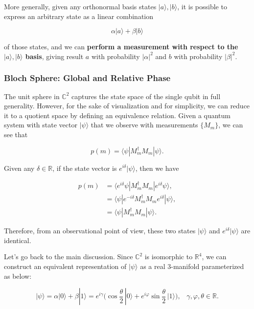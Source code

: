 \documentclass{article}
\theoremstyle{definition}
\begin{document}
      More generally, given any orthonormal basis states $|a \rangle, |b \rangle$, it is possible to express an arbitrary state as a linear combination

        \[ \alpha |a \rangle + \beta |b \rangle \]

      of those states, and we can \textbf{perform a measurement with respect to the $|a\rangle, |b\rangle$ basis}, giving result $a$ with probability $|\alpha|^2$ and $b$ with probability $|\beta|^2$.
  
      \subsubsection{Bloch Sphere: Global and Relative Phase}

        The unit sphere in $\mathbb{C}^2$ captures the state space of the single qubit in full generality. However, for the sake of visualization and for simplicity, we can reduce it to a quotient space by defining an equivalence relation. Given a quantum system with state vector $|\psi \rangle$ that we observe with measurements $\{M_m\}$, we can see that

        \[p(m) = \langle \psi | M_m^\dagger M_m | \psi \rangle.\]

        Given any $\delta \in \mathbb{R}$, if the state vector is $e^{i\delta} |\psi \rangle$, then we have

        \begin{align*}
          p(m) & = \langle e^{i \delta} \psi | M_m^\dagger M_m | e^{i \delta} \psi \rangle, \\
          & = \langle \psi | e^{-i \delta} M_m^\dagger M_m e^{i \delta} | \psi \rangle, \\
          & = \langle \psi | M_m^\dagger M_m | \psi \rangle.
        \end{align*}

        Therefore, from an observational point of view, these two states $|\psi \rangle$ and $e^{i \delta} |\psi \rangle$ are identical.

        Let's go back to the main discussion. Since $\mathbb{C}^2$ is isomorphic to $\mathbb{R}^4$, we can construct an equivalent representation of $|\psi \rangle$ as a real 3-manifold parameterized as below:

          \[|\psi \rangle = \alpha |0 \rangle + \beta | 1 \rangle = e^{i \gamma} \bigg( \cos \frac{\theta}{2} \, |0 \rangle + e^{i \varphi} \sin \frac{\theta}{2} \, | 1\rangle \bigg), \;\;\; \gamma, \varphi, \theta \in \mathbb{R}.\]
\end{document}
